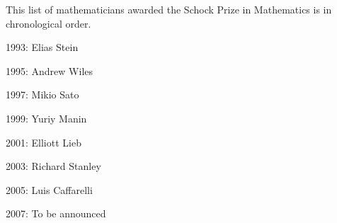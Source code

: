 \documentclass[12pt]{article}
\begin{document}
This list of mathematicians awarded the Schock Prize in Mathematics is in chronological order.

1993: Elias Stein

1995: Andrew Wiles

1997: Mikio Sato

1999: Yuriy Manin

2001: Elliott Lieb

2003: Richard Stanley

2005: Luis Caffarelli

2007: To be announced

\end{document}

